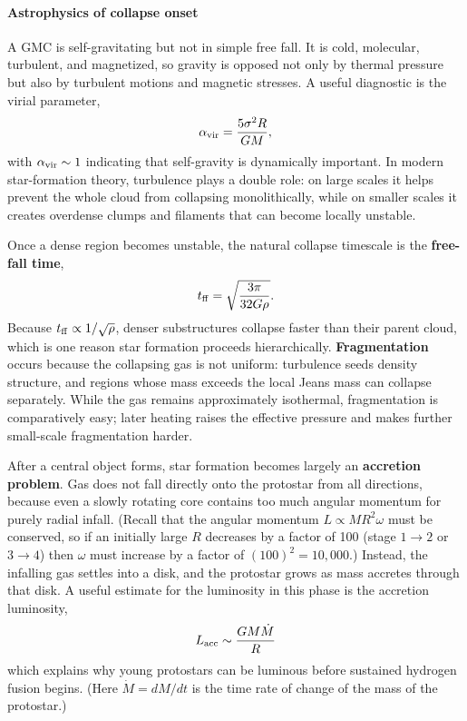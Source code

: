 \documentclass[11pt]{article}
\begin{document}
\paragraph{Astrophysics of collapse
onset}\label{astrophysics-of-collapse-onset}

A GMC is self-gravitating but not in simple free fall. It is cold,
molecular, turbulent, and magnetized, so gravity is opposed not only by
thermal pressure but also by turbulent motions and magnetic stresses. A
useful diagnostic is the virial parameter, \[
\alpha_{\rm vir}=\frac{5\sigma^2 R}{GM},
\] with \(\alpha_{\rm vir}\sim 1\) indicating that self-gravity is
dynamically important. In modern star-formation theory, turbulence plays
a double role: on large scales it helps prevent the whole cloud from
collapsing monolithically, while on smaller scales it creates overdense
clumps and filaments that can become locally unstable.

Once a dense region becomes unstable, the natural collapse timescale is
the \textbf{free-fall time}, \[
t_{\rm ff}=\sqrt{\frac{3\pi}{32G\rho}}.
\] Because \(t_{\rm ff}\propto 1/\sqrt{\rho}\), denser substructures
collapse faster than their parent cloud, which is one reason star
formation proceeds hierarchically. \textbf{Fragmentation} occurs because
the collapsing gas is not uniform: turbulence seeds density structure,
and regions whose mass exceeds the local Jeans mass can collapse
separately. While the gas remains approximately isothermal,
fragmentation is comparatively easy; later heating raises the effective
pressure and makes further small-scale fragmentation harder.

After a central object forms, star formation becomes largely an
\textbf{accretion problem}. Gas does not fall directly onto the
protostar from all directions, because even a slowly rotating core
contains too much angular momentum for purely radial infall. (Recall
that the angular momentum \(L\propto MR^2 \omega\) must be conserved, so
if an initially large \(R\) decreases by a factor of 100 (stage
\(1\to2\) or \(3\to4\)) then \(\omega\) must increase by a factor of
\((100)^2=10,000\).) Instead, the infalling gas settles into a disk, and
the protostar grows as mass accretes through that disk. A useful
estimate for the luminosity in this phase is the accretion luminosity,
\[
L_{\rm acc}\sim \frac{GM\dot M}{R}
\] which explains why young protostars can be luminous before sustained
hydrogen fusion begins. (Here \(\dot M=dM/dt\) is the time rate of
change of the mass of the protostar.)
\end{document}
